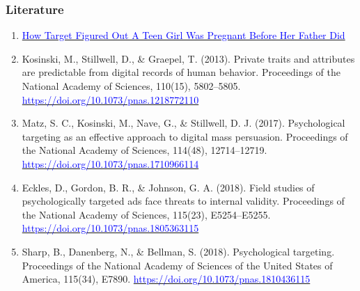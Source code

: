 \documentclass{beamer}
\begin{document}
\begin{frame}
    \frametitle{Literature}
    \scriptsize
    \begin{enumerate}
        \item \href{https://www.forbes.com/sites/kashmirhill/2012/02/16/how-target-figured-out-a-teen-girl-was-pregnant-before-her-father-did/?sh=1333c4646668}{\textcolor{blue}{How Target Figured Out A Teen Girl Was Pregnant Before Her Father Did}}
        \item Kosinski, M., Stillwell, D., \& Graepel, T. (2013). Private traits and attributes are predictable from digital records of human behavior. Proceedings of the National Academy of Sciences, 110(15), 5802–5805. \href{https://doi.org/10.1073/pnas.1218772110}{\textcolor{blue}{https://doi.org/10.1073/pnas.1218772110}}
        \item Matz, S. C., Kosinski, M., Nave, G., \& Stillwell, D. J. (2017). Psychological targeting as an effective approach to digital mass persuasion. Proceedings of the National Academy of Sciences, 114(48), 12714–12719. \href{https://doi.org/10.1073/pnas.1710966114}{\textcolor{blue}{https://doi.org/10.1073/pnas.1710966114}}
        \item Eckles, D., Gordon, B. R., \& Johnson, G. A. (2018). Field studies of psychologically targeted ads face threats to internal validity. Proceedings of the National Academy of Sciences, 115(23), E5254–E5255. \href{https://doi.org/10.1073/pnas.1805363115}{\textcolor{blue}{https://doi.org/10.1073/pnas.1805363115}}
        \item Sharp, B., Danenberg, N., \& Bellman, S. (2018). Psychological targeting. Proceedings of the National Academy of Sciences of the United States of America, 115(34), E7890. \href{https://doi.org/10.1073/pnas.1810436115}{\textcolor{blue}{https://doi.org/10.1073/pnas.1810436115}}
    \end{enumerate}
\end{frame}
\end{document}
